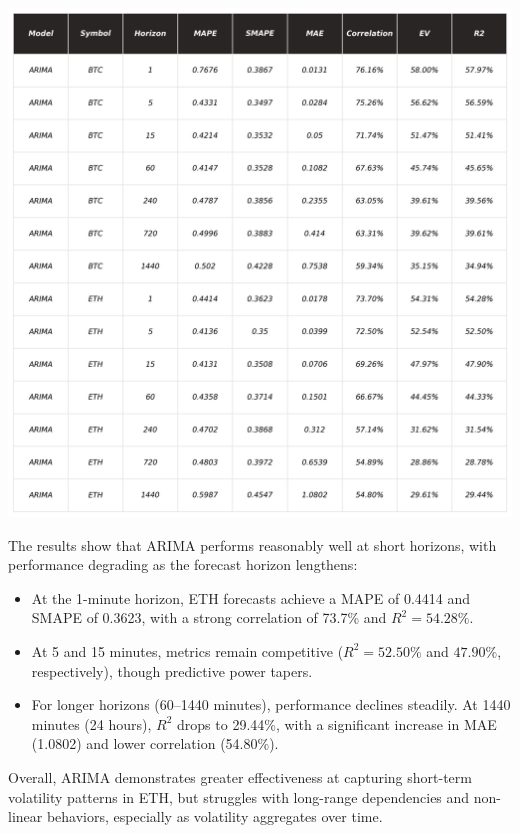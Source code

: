 \documentclass[9pt]{article}
\begin{document}
\begin{multicols}{2}
		\centering
		\includegraphics[width=.99\columnwidth]{img/_KPI_ARIMA.png}
		\label{fig:_KPI_ARIMA}
		\justifying
		\medskip
		
		The results show that ARIMA performs reasonably well at short horizons, with performance degrading as the forecast horizon lengthens:
		\begin{itemize}
			\item At the 1-minute horizon, ETH forecasts achieve a MAPE of 0.4414 and SMAPE of 0.3623, with a strong correlation of 73.7\% and \( R^2 = 54.28\% \).
			\item At 5 and 15 minutes, metrics remain competitive (\( R^2 = 52.50\% \) and \( 47.90\% \), respectively), though predictive power tapers.
			\item For longer horizons (60–1440 minutes), performance declines steadily. At 1440 minutes (24 hours), \( R^2 \) drops to 29.44\%, with a significant increase in MAE (1.0802) and lower correlation (54.80\%).
		\end{itemize}
		
		Overall, ARIMA demonstrates greater effectiveness at capturing short-term volatility patterns in ETH, but struggles with long-range dependencies and non-linear behaviors, especially as volatility aggregates over time.
		

\end{multicols}
\end{document}
